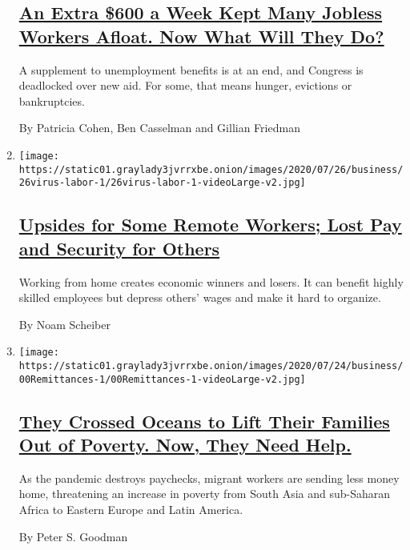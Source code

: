 \begin{enumerate}
{  \subsection{\texorpdfstring{\href{/2020/07/29/business/economy/unemployment-benefits-coronavirus.html}{An
  Extra \$600 a Week Kept Many Jobless Workers Afloat. Now What Will
  They
  Do?}}{An Extra \$600 a Week Kept Many Jobless Workers Afloat. Now What Will They Do?}}\label{an-extra-600-a-week-kept-many-jobless-workers-afloat-now-what-will-they-do}}

  A supplement to unemployment benefits is at an end, and Congress is
  deadlocked over new aid. For some, that means hunger, evictions or
  bankruptcies.

  By Patricia Cohen, Ben Casselman and Gillian Friedman
\item
  \texttt{[image: https://static01.graylady3jvrrxbe.onion/images/2020/07/26/business/26virus-labor-1/26virus-labor-1-videoLarge-v2.jpg]}

  \hypertarget{upsides-for-some-remote-workers-lost-pay-and-security-for-others}{%
  \subsection{\texorpdfstring{\href{/2020/07/26/business/economy/labor-remote-work-coronavirus.html}{Upsides
  for Some Remote Workers; Lost Pay and Security for
  Others}}{Upsides for Some Remote Workers; Lost Pay and Security for Others}}\label{upsides-for-some-remote-workers-lost-pay-and-security-for-others}}

  Working from home creates economic winners and losers. It can benefit
  highly skilled employees but depress others' wages and make it hard to
  organize.

  By Noam Scheiber
\item
  \texttt{[image: https://static01.graylady3jvrrxbe.onion/images/2020/07/24/business/00Remittances-1/00Remittances-1-videoLarge-v2.jpg]}

  \hypertarget{they-crossed-oceans-to-lift-their-families-out-of-poverty-now-they-need-help}{%
  \subsection{\texorpdfstring{\href{/2020/07/27/business/global-remittances-coronavirus.html}{They
  Crossed Oceans to Lift Their Families Out of Poverty. Now, They Need
  Help.}}{They Crossed Oceans to Lift Their Families Out of Poverty. Now, They Need Help.}}\label{they-crossed-oceans-to-lift-their-families-out-of-poverty-now-they-need-help}}

  As the pandemic destroys paychecks, migrant workers are sending less
  money home, threatening an increase in poverty from South Asia and
  sub-Saharan Africa to Eastern Europe and Latin America.

  By Peter S. Goodman
\end{enumerate}

